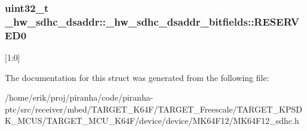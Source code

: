 \subsubsection[{\texorpdfstring{R\+E\+S\+E\+R\+V\+E\+D0}{RESERVED0}}]{\setlength{\rightskip}{0pt plus 5cm}uint32\+\_\+t \+\_\+hw\+\_\+sdhc\+\_\+dsaddr\+::\+\_\+hw\+\_\+sdhc\+\_\+dsaddr\+\_\+bitfields\+::\+R\+E\+S\+E\+R\+V\+E\+D0}\hypertarget{struct__hw__sdhc__dsaddr_1_1__hw__sdhc__dsaddr__bitfields_a858f6273dc37008a7b33f3c43d3ab7cb}{}\label{struct__hw__sdhc__dsaddr_1_1__hw__sdhc__dsaddr__bitfields_a858f6273dc37008a7b33f3c43d3ab7cb}
\mbox{[}1\+:0\mbox{]} 

The documentation for this struct was generated from the following file\+:\begin{DoxyCompactItemize}
\item 
/home/erik/proj/piranha/code/piranha-\/ptc/src/receiver/mbed/\+T\+A\+R\+G\+E\+T\+\_\+\+K64\+F/\+T\+A\+R\+G\+E\+T\+\_\+\+Freescale/\+T\+A\+R\+G\+E\+T\+\_\+\+K\+P\+S\+D\+K\+\_\+\+M\+C\+U\+S/\+T\+A\+R\+G\+E\+T\+\_\+\+M\+C\+U\+\_\+\+K64\+F/device/device/\+M\+K64\+F12/M\+K64\+F12\+\_\+sdhc.\+h\end{DoxyCompactItemize}
